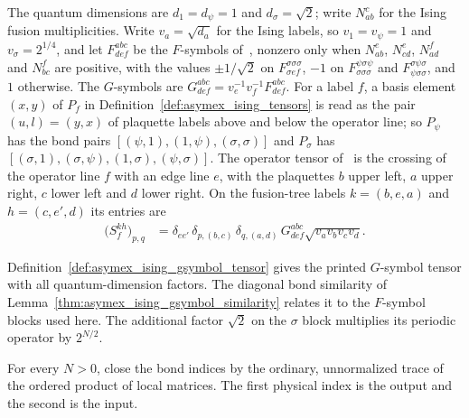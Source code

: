 \begin{definition}
    \label{def:asymex_ising_gsymbol_tensor}
    \leanok
    The quantum dimensions are $d_1=d_\psi=1$ and $d_\sigma=\sqrt2$;
    write $N_{ab}^c$ for the Ising fusion multiplicities.
    Write $v_a=\sqrt{d_a}$ for the Ising labels, so $v_1=v_\psi=1$ and
    $v_\sigma=2^{1/4}$, and let $F^{abc}_{def}$ be the $F$-symbols
    of~\cite[Appendix~D.2]{Bultinck2017Anyons}, nonzero only when
    $N_{ab}^e$, $N_{cd}^e$, $N_{ad}^f$ and $N_{bc}^f$ are positive, with the
    values $\pm1/\sqrt2$ on $F^{\sigma\sigma\sigma}_{\sigma ef}$, $-1$ on
    $F^{\psi\sigma\psi}_{\sigma\sigma\sigma}$ and
    $F^{\sigma\psi\sigma}_{\psi\sigma\sigma}$, and $1$ otherwise. The
    $G$-symbols are $G^{abc}_{def}=v_e^{-1}v_f^{-1}F^{abc}_{def}$. For a
    label $f$, a basis element $(x,y)$ of $P_f$ in
    Definition~\ref{def:asymex_ising_tensors} is read as the pair
    $(u,l)=(y,x)$ of plaquette labels above and below the operator line; so
    $P_\psi$ has the bond pairs $[(\psi,1),(1,\psi),(\sigma,\sigma)]$ and
    $P_\sigma$ has $[(\sigma,1),(\sigma,\psi),(1,\sigma),(\psi,\sigma)]$. The operator tensor
    of~\cite[Section~6.2 and Appendix~D.1]{Bultinck2017Anyons} is the
    crossing of the operator line $f$ with an edge line $e$, with the
    plaquettes $b$ upper left, $a$ upper right, $c$ lower left and $d$
    lower right. On the fusion-tree labels $k=(b,e,a)$ and $h=(c,e',d)$ its
    entries are
    \begin{align}
        \bigl(S_f^{kh}\bigr)_{p,q}
         & =\delta_{ee'}\,\delta_{p,(b,c)}\,\delta_{q,(a,d)}\,
        G^{abc}_{def}\sqrt{v_av_bv_cv_d}.
        \label{eq:asymex_ising_gsymbol_tensor}
    \end{align}
\end{definition}

Definition~\ref{def:asymex_ising_gsymbol_tensor} gives the printed
$G$-symbol tensor with all quantum-dimension factors. The diagonal bond
similarity of Lemma~\ref{thm:asymex_ising_gsymbol_similarity} relates it
to the $F$-symbol blocks used here. The additional factor $\sqrt2$ on the
$\sigma$ block multiplies its periodic operator by $2^{N/2}$.

For every $N>0$, close the bond indices by the ordinary, unnormalized
trace of the ordered product of local matrices. The first physical
index is the output and the second is the input.

